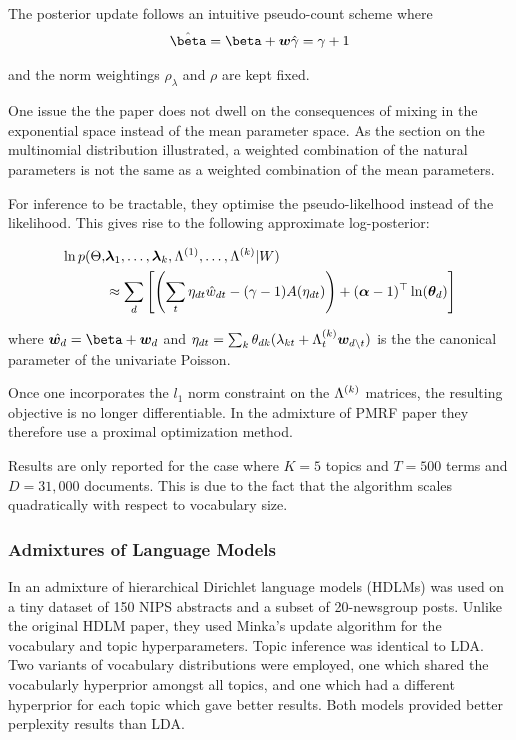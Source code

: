 The posterior update follows an intuitive pseudo-count scheme where
\begin{align}
\hat{\vv{\beta}} = \vv{\beta} + \vv{w}
\hat{\gamma}     = \gamma + 1
\end{align}

and the norm weightings $\rho_\lambda$ and $\rho$ are kept fixed.

One issue the the paper does not dwell on the consequences of mixing in the exponential space instead of the mean parameter space. As the section on the multinomial distribution illustrated, a weighted combination of the natural parameters is not the same as a weighted combination of the mean parameters.

For inference to be tractable, they optimise the pseudo-likelhood instead of the likelihood. This gives rise to the following approximate log-posterior:

\begin{align}
\begin{split}
\ln p(\Theta, & \bm \lambda_1, \ldots, \bm \lambda_k, \Lambda^{(1)}, \ldots, \Lambda^{(k)} | W) \\
& \approx \sum_d \left[ \left( \sum_t \eta_{dt} \hat{w}_{dt} - (\gamma - 1)A(\eta_{dt}) \right) + (\bm \alpha - 1)^\top\ln({ \bm \theta_d }) \right]
\end{split}
\end{align}

where $\hat{\wdoc} = \vv{\beta} + \wdoc$ and $\eta_{dt} = \sum_k { \theta_{dk} } (\lambda_{kt} + \Lambda^{(k)}_t \bm w_{d \setminus t})$ is the the canonical parameter of the univariate Poisson.


Once one incorporates the $l_1$ norm constraint on the $\Lambda^{(k)}$ matrices, the resulting objective is no longer differentiable. In the admixture of PMRF paper they therefore use a proximal optimization method.


Results are only reported for the case where $K=5$ topics and $T=500$ terms and $D=31,000$ documents. This is due to the fact that the algorithm scales quadratically with respect to vocabulary size. 



\subsubsection*{Admixtures of Language Models}
In \cite{Wallach2006} an admixture of hierarchical Dirichlet language models (HDLMs)\cite{MacKay1995} was used on a tiny dataset of 150 NIPS abstracts and a subset of 20-newsgroup posts. Unlike the original HDLM paper, they used Minka's update algorithm\cite{Minka2002} for the vocabulary and topic hyperparameters. Topic inference was identical to LDA. Two variants of vocabulary distributions were employed, one which shared the vocabularly hyperprior amongst all topics, and one which had a different hyperprior for each topic which gave better results. Both models provided better perplexity results than LDA.

